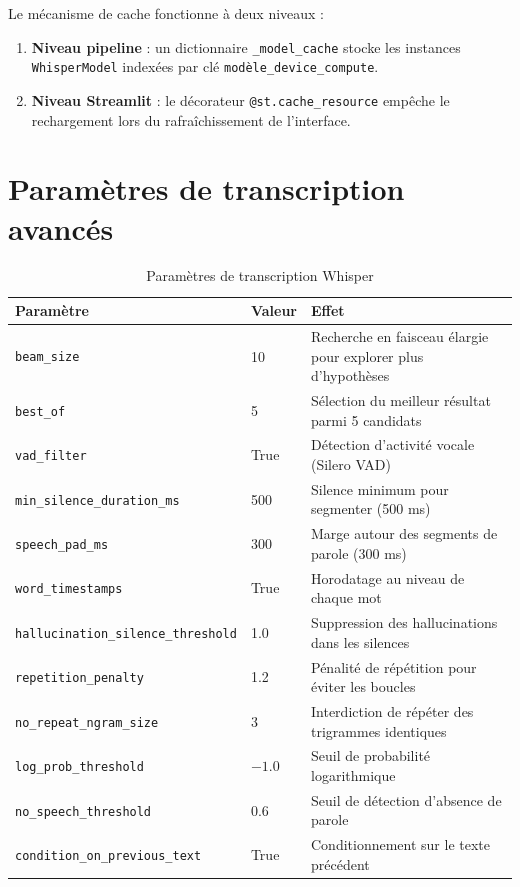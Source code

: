 \documentclass[12pt,a4paper]{report}
\begin{document}
Le mécanisme de cache fonctionne à deux niveaux :
\begin{enumerate}
    \item \textbf{Niveau pipeline} : un dictionnaire \texttt{\_model\_cache} stocke les instances \texttt{WhisperModel} indexées par clé \texttt{modèle\_device\_compute}.
    \item \textbf{Niveau Streamlit} : le décorateur \texttt{@st.cache\_resource} empêche le rechargement lors du rafraîchissement de l'interface.
\end{enumerate}

\section{Paramètres de transcription avancés}

\begin{table}[H]
    \centering
    \caption{Paramètres de transcription Whisper}
    \label{tab:whisper_params}
    \begin{tabular}{@{} l l p{6.5cm} @{}}
        \toprule
        \textbf{Paramètre} & \textbf{Valeur} & \textbf{Effet} \\
        \midrule
        \texttt{beam\_size} & 10 & Recherche en faisceau élargie pour explorer plus d'hypothèses \\
        \texttt{best\_of} & 5 & Sélection du meilleur résultat parmi 5 candidats \\
        \texttt{vad\_filter} & True & Détection d'activité vocale (Silero VAD) \\
        \texttt{min\_silence\_duration\_ms} & 500 & Silence minimum pour segmenter (500 ms) \\
        \texttt{speech\_pad\_ms} & 300 & Marge autour des segments de parole (300 ms) \\
        \texttt{word\_timestamps} & True & Horodatage au niveau de chaque mot \\
        \texttt{hallucination\_silence\_threshold} & 1.0 & Suppression des hallucinations dans les silences \\
        \texttt{repetition\_penalty} & 1.2 & Pénalité de répétition pour éviter les boucles \\
        \texttt{no\_repeat\_ngram\_size} & 3 & Interdiction de répéter des trigrammes identiques \\
        \texttt{log\_prob\_threshold} & $-1.0$ & Seuil de probabilité logarithmique \\
        \texttt{no\_speech\_threshold} & 0.6 & Seuil de détection d'absence de parole \\
        \texttt{condition\_on\_previous\_text} & True & Conditionnement sur le texte précédent \\
        \bottomrule
    \end{tabular}
\end{table}
\end{document}
